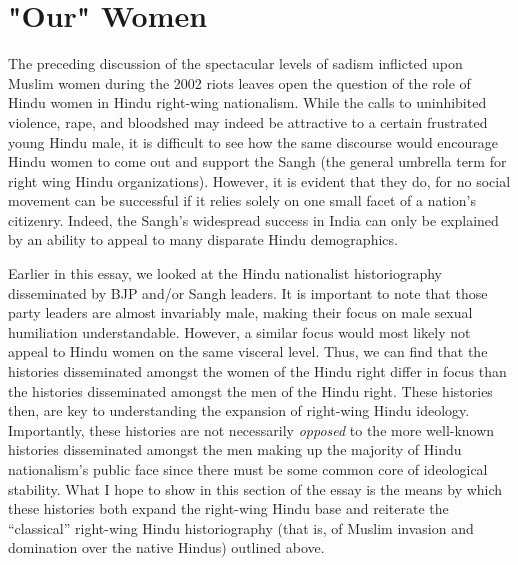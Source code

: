 \documentclass[a4paper, 12pt]{article}
\begin{document}
\section*{"Our" Women}
The preceding discussion of the spectacular levels of sadism inflicted upon Muslim women during the 2002 riots leaves open the question of the role of Hindu women in Hindu right-wing nationalism. While the calls to uninhibited violence, rape, and bloodshed may indeed be attractive to a certain frustrated young Hindu male, it is difficult to see how the same discourse would encourage Hindu women to come out and support the Sangh (the general umbrella term for right wing Hindu organizations). However, it is evident that they do, for no social movement can be successful if it relies solely on one small facet of a nation’s citizenry. Indeed, the Sangh's widespread success in India can only be explained by an ability to appeal to many disparate Hindu demographics. 
\par
Earlier in this essay, we looked at the Hindu nationalist historiography disseminated by BJP and/or Sangh leaders. It is important to note that those party leaders are almost invariably male, making their focus on male sexual humiliation understandable. However, a similar focus would most likely not appeal to Hindu women on the same visceral level. Thus, we can find that the histories disseminated amongst the women of the Hindu right differ in focus than the histories disseminated amongst the men of the Hindu right. These histories then, are key to understanding the expansion of right-wing Hindu ideology. Importantly, these histories are not necessarily \textit{opposed} to the more well-known histories disseminated amongst the men making up the majority of Hindu nationalism's public face since there must be some common core of ideological stability. What I hope to show in this section of the essay is the means by which these histories both expand the right-wing Hindu base and reiterate the “classical” right-wing Hindu historiography (that is, of Muslim invasion and domination over the native Hindus) outlined above. 
\par 
\end{document}
